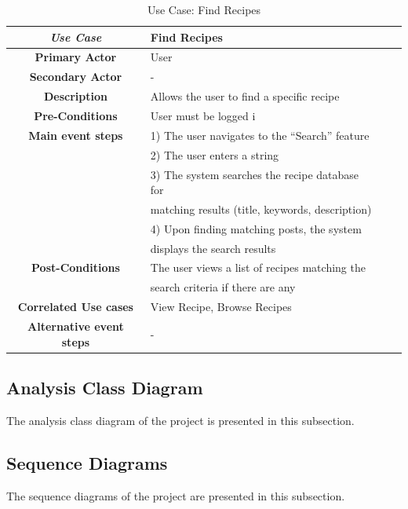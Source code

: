 \begin{table}[ht!]
    \centering
    \caption{Use Case: Find Recipes}
    \begin{tabular}{|Sl|Sl|}
        \hline
        \textbf{\textit{Use Case}}      & \textbf{Find Recipes}                            \\ \hline
        \textbf{Primary Actor}          & User                                            \\ \hline
        \textbf{Secondary Actor}         & -                                               \\ \hline
        \textbf{Description}             & Allows the user to find a specific recipe       \\ \hline
        \textbf{Pre-Conditions}          & User must be logged i                        \\ \hline
        \textbf{Main event steps}        & 1) The user navigates to the “Search” feature   \\
                                          & 2) The user enters a string                     \\
                                          & 3) The system searches the recipe database for  \\
                                          & matching results (title, keywords, description) \\ 
                                          & 4) Upon finding matching posts, the system      \\
                                         & displays the search results                     \\ \hline
        \textbf{Post-Conditions}         & The user views a list of recipes matching the   \\ 
                                         & search criteria if there are any                \\ \hline
        \textbf{Correlated Use cases}    & View Recipe, Browse Recipes                     \\ \hline
        \textbf{Alternative event steps} & -                                               \\ \hline
    \end{tabular}\label{tab:table}
\end{table}
\subsection{Analysis Class Diagram}\label{subsec:analysis-class-diagram}

The analysis class diagram of the project is presented in this subsection.

\subsection{Sequence Diagrams}\label{subsec:sequence-diagrams}

The sequence diagrams of the project are presented in this subsection.

